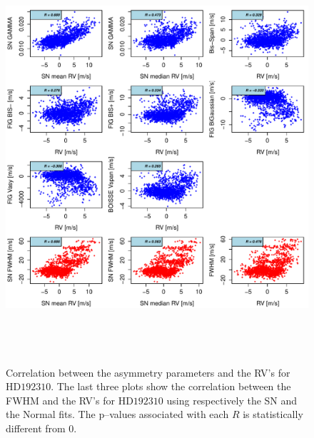 \documentclass[11pt, oneside]{article}
\begin{document}
\begin{figure}[htbp]
   \centering
\includegraphics[height = 6in]{HD19231_[4]Comparison_para.pdf} 
   \caption{Correlation between the asymmetry parameters and the RV's for $\text{HD}192310$. The last three plots show the correlation between the FWHM and the RV's for $\text{HD}192310$ using respectively the SN and the Normal fits. The p--values associated with each $R$ is statistically different from $0$.}
   \label{fig:Gliese785:corrPlot}
\end{figure}
\end{document}
